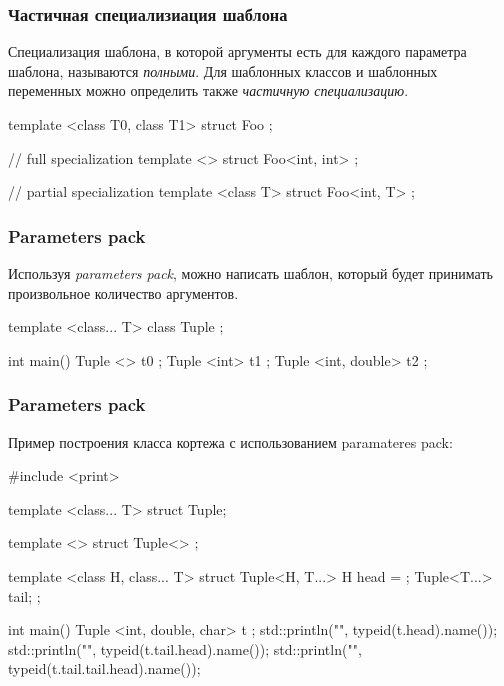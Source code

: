 \documentclass[compress, 8pt, aspectratio=169]{beamer}
\begin{document}
  \begin{frame}[fragile]

    \frametitle{Частичная специализиация шаблона}

    Специализация шаблона, в которой аргументы есть для
    каждого параметра шаблона, называются \textit{полными}.
    Для шаблонных классов и шаблонных переменных можно
    определить также \textit{частичную специализацию}\footnotemark{}.


    \begin{myinplacelisting}[minted language=cpp]
template <class T0, class T1>
struct Foo {};

// full specialization
template <>
struct Foo<int, int> {};

// partial specialization
template <class T>
struct Foo<int, T> {};
    \end{myinplacelisting}

  \end{frame}

  \begin{frame}[fragile]

    \frametitle{Parameters pack}

    Используя \textit{parameters pack}\footnotemark{},
    можно написать шаблон, который будет принимать произвольное
    количество аргументов.

    \begin{myinplacelisting}[minted language=cpp]
template <class... T>
class Tuple {};

int main() {
    Tuple <> t0 {};
    Tuple <int> t1 {};
    Tuple <int, double> t2 {};
}
    \end{myinplacelisting}

  \end{frame}

  \begin{frame}[fragile]

    \frametitle{Parameters pack}

    Пример построения класса кортежа с использованием
    paramateres pack:

    \begin{myinplacelisting}[minted language=cpp]
#include <print>

template <class... T>
struct Tuple;

template <>
struct Tuple<> {};

template <class H, class... T>
struct Tuple<H, T...> {
    H head = {};
    Tuple<T...> tail;
};

int main() {
    Tuple <int, double, char> t {};
    std::println("{}", typeid(t.head).name());
    std::println("{}", typeid(t.tail.head).name());
    std::println("{}", typeid(t.tail.tail.head).name());
}
    \end{myinplacelisting}

  \end{frame}
\end{document}
